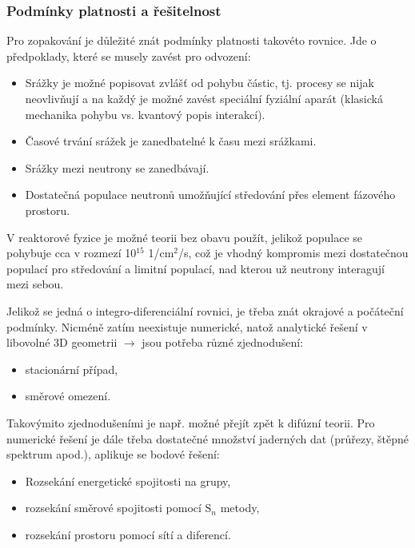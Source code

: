 \subsubsection{Podmínky platnosti a řešitelnost}

Pro zopakování je důležité znát podmínky platnosti takovéto rovnice. Jde o předpoklady, které se musely zavést pro odvození:

\begin{itemize}
  \item Srážky je možné popisovat zvlášť od pohybu částic, tj. procesy se nijak neovlivňují a na každý je možné zavést speciální fyziální aparát (klasická mechanika pohybu vs. kvantový popis interakcí).
  \item Časové trvání srážek je zanedbatelné k času mezi srážkami.
  \item Srážky mezi neutrony se zanedbávají.
  \item Dostatečná populace neutronů umožňující středování přes element fázového prostoru.
\end{itemize}

V reaktorové fyzice je možné teorii bez obavu použít, jelikož populace se pohybuje cca v rozmezí 10$^{15}$ 1/cm$^2$/s, což je vhodný kompromis mezi dostatečnou populací pro středování a limitní populací, nad kterou už neutrony interagují mezi sebou.

Jelikož se jedná o integro-diferenciální rovnici, je třeba znát okrajové a počáteční podmínky. Nicméně zatím neexistuje numerické, natož analytické řešení v libovolné 3D geometrii $\rightarrow$ jsou potřeba různé zjednodušení:

\begin{itemize}
  \item stacionární případ,
  \item směrové omezení.
\end{itemize}

Takovýmito zjednodušeními je např. možné přejít zpět k difúzní teorii. Pro numerické řešení je dále třeba dostatečné množství jaderných dat (průřezy, štěpné spektrum apod.), aplikuje se bodové řešení:

\begin{itemize}
  \item Rozsekání energetické spojitosti na grupy,
  \item rozsekání směrové spojitosti pomocí S$_n$ metody,
  \item rozsekání prostoru pomocí sítí a diferencí.
\end{itemize}

